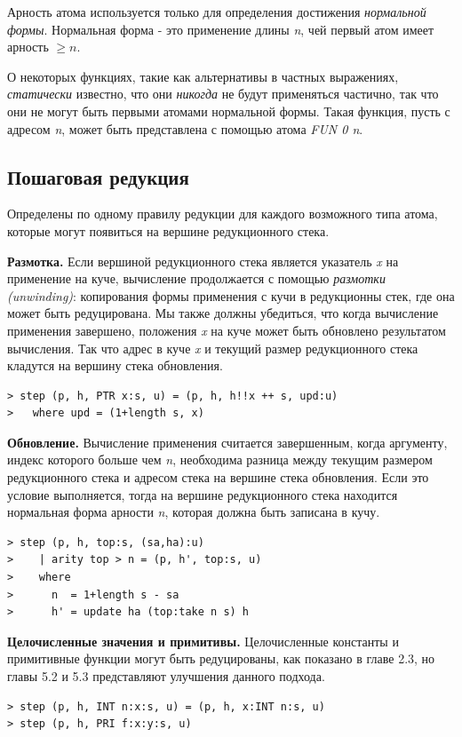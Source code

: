 \documentclass[flenqn, 14pt]{extarticle}
\begin{document}
Арность атома используется только для определения достижения \textit{нормальной формы}. Нормальная форма - это применение длины \textit{n}, чей первый атом имеет арность $\geq n$.

О некоторых функциях, такие как альтернативы в частных выражениях, \textit{статически} известно, что они \textit{никогда} не будут применяться частично, так что они не могут быть первыми атомами нормальной формы. Такая функция, пусть с адресом \textit{n}, может быть представлена с помощью атома \textit{FUN 0 n}.

\subsection{Пошаговая редукция}
Определены по одному правилу редукции для каждого возможного типа атома, которые могут появиться на вершине редукционного стека.

\textbf{Размотка.} Если вершиной редукционного стека является указатель \textit{x} на применение на куче, вычисление продолжается с помощью \textit{размотки (unwinding)}: копирования формы применения с кучи в редукционны стек, где она может быть редуцирована. Мы также должны убедиться, что когда вычисление применения завершено, положения \textit{x} на куче может быть обновлено результатом вычисления. Так что адрес в куче \textit{x} и текущий размер редукционного стека кладутся на вершину стека обновления.

\begin{verbatim}
> step (p, h, PTR x:s, u) = (p, h, h!!x ++ s, upd:u)
>   where upd = (1+length s, x)
\end{verbatim}  

\textbf{Обновление.} Вычисление применения считается завершенным, когда аргументу, индекс которого больше чем \textit{n}, необходима разница между текущим размером редукционного стека и адресом стека на вершине стека обновления. Если это условие выполняется, тогда на вершине редукционного стека находится нормальная форма арности \textit{n}, которая должна быть записана в кучу.
\begin{verbatim}
> step (p, h, top:s, (sa,ha):u)
>    | arity top > n = (p, h', top:s, u)
>    where
>      n  = 1+length s - sa
>      h' = update ha (top:take n s) h
\end{verbatim}

\textbf{Целочисленные значения и примитивы.} Целочисленные константы и примитивные функции могут быть редуцированы, как показано в главе 2.3, но главы 5.2 и 5.3 представляют улучшения данного подхода.
\begin{verbatim}
> step (p, h, INT n:x:s, u) = (p, h, x:INT n:s, u)
> step (p, h, PRI f:x:y:s, u)
\end{verbatim}
\end{document}

